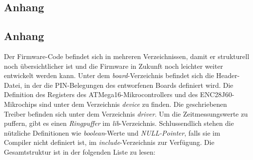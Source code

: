 
\appendix
\begin{landscape}
	\chapter{Anhang}\label{anhang:schaltung}
	
\end{landscape}


\begin{landscape}
	\begin{multicols}{2}
		\chapter{Anhang}\label{anhang:software}

		Der Firmware-Code befindet sich in mehreren Verzeichnissen, damit er strukturell noch übersichtlicher ist und die Firmware in Zukunft noch leichter weiter entwickelt werden kann. Unter dem \textit{board}-Verzeichnis befindet sich die Header-Datei, in der die PIN-Belegungen des entworfenen Boards definiert wird. Die Definition des Registers des ATMega16-Mikrocontrollers und des ENC28J60-Mikrochips sind unter dem Verzeichnis \textit{device} zu finden. Die geschriebenen Treiber befinden sich unter dem Verzeichnis \textit{driver}. Um die Zeitmessungswerte zu puffern, gibt es einen \textit{Ringpuffer} im \textit{lib}-Verzeichnis. Schlussendlich stehen die nützliche Definitionen wie \textit{boolean}-Werte und \textit{NULL-Pointer}, falls sie im Compiler nicht definiert ist, im \textit{include}-Verzeichnis zur Verfügung. Die Gesamtstruktur ist in der folgenden Liste zu lesen: \\ \\ \\ \\

		\inputminted[fontsize=\scriptsize]{text}{./code/firmware/README}
		\end{multicols}
\end{landscape}

